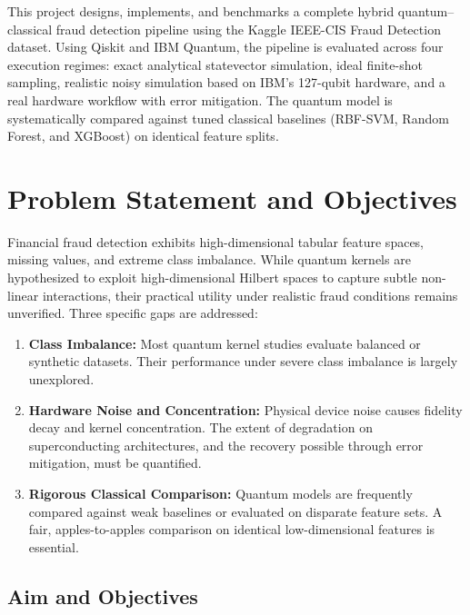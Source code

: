 \documentclass[12pt,a4paper]{article}
\begin{document}
This project designs, implements, and benchmarks a complete hybrid quantum--classical fraud detection pipeline using the Kaggle IEEE-CIS Fraud Detection dataset. Using Qiskit and IBM Quantum, the pipeline is evaluated across four execution regimes: exact analytical statevector simulation, ideal finite-shot sampling, realistic noisy simulation based on IBM's 127-qubit hardware, and a real hardware workflow with error mitigation. The quantum model is systematically compared against tuned classical baselines (RBF-SVM, Random Forest, and XGBoost) on identical feature splits.

\section{Problem Statement and Objectives}

Financial fraud detection exhibits high-dimensional tabular feature spaces, missing values, and extreme class imbalance. While quantum kernels are hypothesized to exploit high-dimensional Hilbert spaces to capture subtle non-linear interactions, their practical utility under realistic fraud conditions remains unverified. Three specific gaps are addressed:
\begin{enumerate}
    \item \textbf{Class Imbalance:} Most quantum kernel studies evaluate balanced or synthetic datasets. Their performance under severe class imbalance is largely unexplored.
    \item \textbf{Hardware Noise and Concentration:} Physical device noise causes fidelity decay and kernel concentration. The extent of degradation on superconducting architectures, and the recovery possible through error mitigation, must be quantified.
    \item \textbf{Rigorous Classical Comparison:} Quantum models are frequently compared against weak baselines or evaluated on disparate feature sets. A fair, apples-to-apples comparison on identical low-dimensional features is essential.
\end{enumerate}

\subsection*{Aim and Objectives}
\end{document}

